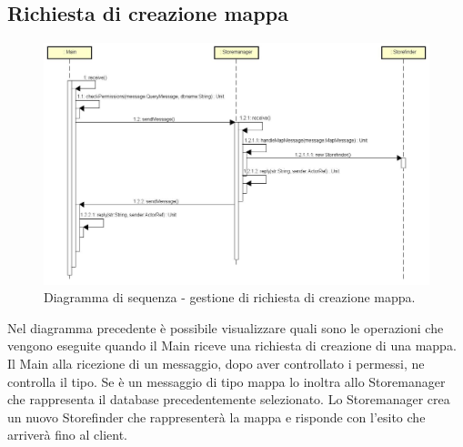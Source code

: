\documentclass[a4paper]{article}
\begin{document}
        \subsection{Richiesta di creazione mappa}
            \begin{figure} [H]
				\centering
				\includegraphics[width=\textwidth]{ST/Sequenza/seqNuovaMappa.jpg}
				\caption{Diagramma di sequenza - gestione di richiesta di creazione mappa.}
			\end{figure}
            Nel diagramma precedente è possibile visualizzare quali sono le operazioni che vengono eseguite quando il Main riceve una richiesta di creazione di una mappa. Il Main alla ricezione di un messaggio, dopo aver controllato i permessi, ne controlla il tipo. Se è un messaggio di tipo mappa lo inoltra allo Storemanager che rappresenta il database precedentemente selezionato. Lo Storemanager crea un nuovo Storefinder che rappresenterà la mappa e risponde con l'esito che arriverà fino al client.
            
\end{document}
